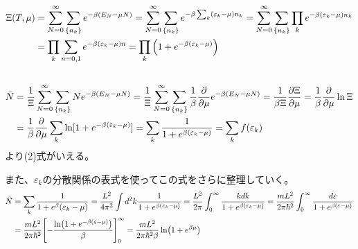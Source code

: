 \documentclass[../../master.tex]{subfiles}
\begin{document}
\subsection{}
\begin{equation}\begin{aligned}[b]
    \Xi(T,\mu)
    &= \sum_{N=0}^{\infty}\sum_{\{n_k\}}e^{-\beta(E_N-\mu N)}
    = \sum_{N=0}^{\infty}\sum_{\{n_k\}}e^{-\beta\sum_k(\varepsilon_k-\mu)n_k}
    = \sum_{N=0}^{\infty}\sum_{\{n_k\}}\prod_k e^{-\beta(\varepsilon_k-\mu)n_k}\\
    &= \prod_k \sum_{n=0,1}e^{-\beta(\varepsilon_k-\mu)n}
    = \prod_k \qty(1+e^{-\beta(\varepsilon_k-\mu)})
\end{aligned}\end{equation}

\subsection{}
\begin{equation}\begin{aligned}[b]
    \bar{N}
    &= \frac{1}{\Xi}\sum_{N=0}^{\infty}\sum_{\{n_k\}}Ne^{-\beta(E_N-\mu N)}
    = \frac{1}{\Xi}\sum_{N=0}^{\infty}\sum_{\{n_k\}}\frac{1}{\beta}\pdv{\mu}e^{-\beta(E_N-\mu N)}
    = \frac{1}{\beta\Xi}\pdv{\Xi}{\mu}
    = \frac{1}{\beta}\pdv{\mu}\ln\Xi\\
    &=  \frac{1}{\beta}\pdv{\mu}\sum_k\ln[1+e^{-\beta(\varepsilon_k-\mu)}]
    = \sum_k \frac{1}{1+e^{\beta(\varepsilon_k-\mu)}} = \sum_kf(\varepsilon_k)
\end{aligned}\end{equation}
より(2)式がいえる。

また、\(\varepsilon_k\)の分散関係の表式を使ってこの式をさらに整理していく。
\begin{equation}\begin{aligned}[b]
    \bar{N}
    &= \sum_k \frac{1}{1+e^{\beta}(\varepsilon_k-\mu)}
    = \frac{L^2}{4\pi^2}\int d^2k \frac{1}{1+e^{\beta(\varepsilon_k-\mu)}}
    = \frac{L^2}{2\pi}\int_{0}^{\infty} \frac{kdk}{1+e^{\beta(\varepsilon_k-\mu)}}
    = \frac{mL^2}{2\pi\hbar^2}\int_{0}^{\infty} \frac{d\varepsilon}{1+e^{\beta(\varepsilon-\mu)}}\\
    &= \frac{mL^2}{2\pi\hbar^2}\qty[-\frac{\ln(1+e^{-\beta(\varepsilon-\mu)})}{\beta}]_0^{\infty}
    = \frac{mL^2}{2\pi\hbar^2\beta}\ln(1+e^{\beta\mu})
\end{aligned}\end{equation}
\end{document}
